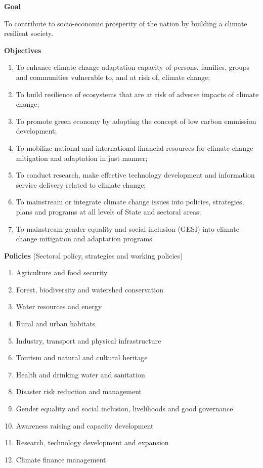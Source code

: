 \documentclass[
]{book}
\providecommand{\tightlist}{%
  \setlength{\itemsep}{0pt}\setlength{\parskip}{0pt}}
\begin{document}
\textbf{Goal}

To contribute to socio-economic prosperity of the nation by building a climate resilient society.

\textbf{Objectives}

\begin{enumerate}
\def\labelenumi{\alph{enumi}.}
\tightlist
\item
  To enhance climate change adaptation capacity of persons, families, groups and communities vulnerable to, and at risk of, climate change;
\item
  To build resilience of ecosystems that are at risk of adverse impacts of climate change;
\item
  To promote green economy by adopting the concept of low carbon emmission development;
\item
  To mobilize national and international financial resources for climate change mitigation and adaptation in just manner;
\item
  To conduct research, make effective technology development and information service delivery related to climate change;
\item
  To mainstream or integrate climate change issues into policies, strategies, plans and programs at all levels of State and sectoral areas;
\item
  To mainstream gender equality and social inclusion (GESI) into climate change mitigation and adaptation programs.
\end{enumerate}

\textbf{Policies} (Sectoral policy, strategies and working policies)

\begin{enumerate}
\def\labelenumi{\arabic{enumi}.}
\tightlist
\item
  Agriculture and food security
\item
  Forest, biodiversity and watershed conservation
\item
  Water resources and energy
\item
  Rural and urban habitats
\item
  Industry, transport and physical infrastructure
\item
  Tourism and natural and cultural heritage
\item
  Health and drinking water and sanitation
\item
  Disaster risk reduction and management
\item
  Gender equality and social inclusion, livelihoods and good governance
\item
  Awareness raising and capacity development
\item
  Research, technology development and expansion
\item
  Climate finance management
\end{enumerate}
\end{document}
